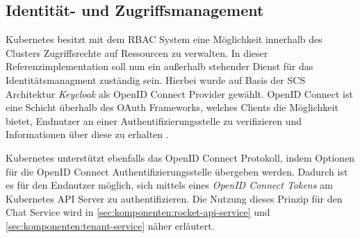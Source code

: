 \subsection{Identität- und Zugriffsmanagement}
Kubernetes besitzt mit dem \ac{RBAC} System eine Möglichkeit innerhalb des Clusters Zugriffsrechte auf Ressourcen
zu verwalten. In dieser Referenzimplementation soll nun ein außerhalb stehender Dienst für das Identitätsmanagment
zuständig sein. Hierbei wurde auf Basis der \ac{SCS} Architektur \emph{Keycloak} als OpenID Connect Provider gewählt.
OpenID Connect ist eine Schicht überhalb des OAuth Frameworks, welches Clients die Möglichkeit bietet, Endnutzer
an einer Authentifizierungsstelle zu verifizieren und Informationen über diese zu erhalten \cite{OpenID2021}.


Kubernetes unterstützt ebenfalls das OpenID Connect Protokoll, indem Optionen für die OpenID Connect Authentifizierungsstelle
übergeben werden. Dadurch ist es für den Endnutzer möglich, sich mittels eines \emph{OpenID Connect Tokens} am 
Kubernetes API Server zu authentifizieren. Die Nutzung dieses Prinzip für den Chat Service wird 
in \ref{sec:komponenten:rocket-api-service} und \ref{sec:komponenten:tenant-service} näher erläutert.
